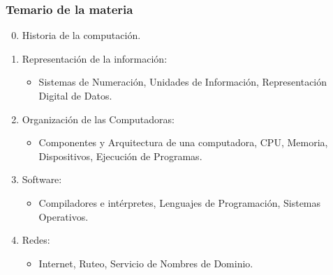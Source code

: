 \documentclass[11pt,a4paper,spanish]{beamer}
\begin{document}
\begin{frame}

    \frametitle{Temario de la materia}

\begin{enumerate}

    \setcounter{enumi}{-1}

    \item Historia de la computación.

    \item Representación de la información:
        \begin{itemize}
            \item Sistemas de Numeración, Unidades de Información,
                Representación Digital de Datos.
        \end{itemize}

    \item Organización de las Computadoras:
        \begin{itemize}
            \item Componentes y Arquitectura de una computadora, CPU, Memoria,
                Dispositivos, Ejecución de Programas.
        \end{itemize}

    \item Software:
        \begin{itemize}
            \item Compiladores e intérpretes, Lenguajes de Programación,
                Sistemas Operativos.
        \end{itemize}

    \item Redes:
        \begin{itemize}
            \item Internet, Ruteo, Servicio de Nombres de Dominio.
        \end{itemize}

\end{enumerate}

\end{frame}
\end{document}
